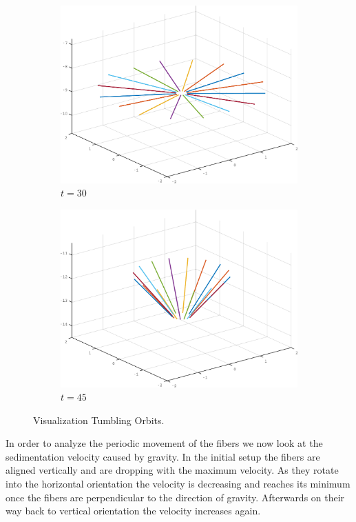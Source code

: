 \documentclass[a4paper,11pt]{kth-mag}
\begin{document}
\begin{figure}[!htbp]
\begin{subfigure}[h]{0.45\textwidth}
    \includegraphics[width=\textwidth]{img/ring_00030.pdf}
    \caption{$t=30$}\label{fig:ring_simulation_1c}
  \end{subfigure}
  \begin{subfigure}[h]{0.45\textwidth}
    \centering
    \includegraphics[width=\textwidth]{img/ring_00045.pdf}
    \caption{$t=45$}\label{fig:ring_simulation_1d}
  \end{subfigure}
  \caption{Visualization Tumbling Orbits.}
  \label{fig:ring_simulation}
\end{figure}

In order to analyze the periodic movement of the fibers we now look at the sedimentation velocity caused by gravity. In the initial setup the fibers are aligned vertically and are dropping with the maximum velocity. As they rotate into the horizontal orientation the velocity is decreasing and reaches its minimum once the fibers are perpendicular to the direction of gravity. Afterwards on their way back to vertical orientation the velocity increases again.
\end{document}
